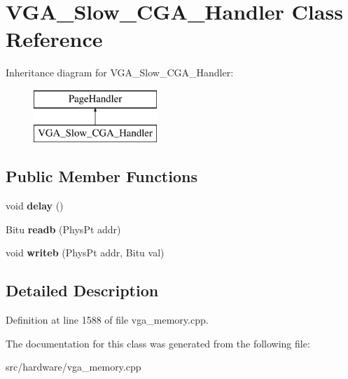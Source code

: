 \hypertarget{classVGA__Slow__CGA__Handler}{\section{V\-G\-A\-\_\-\-Slow\-\_\-\-C\-G\-A\-\_\-\-Handler Class Reference}
\label{classVGA__Slow__CGA__Handler}
}
Inheritance diagram for V\-G\-A\-\_\-\-Slow\-\_\-\-C\-G\-A\-\_\-\-Handler\-:\begin{figure}[H]
\begin{center}
\leavevmode
\includegraphics[height=2.000000cm]{classVGA__Slow__CGA__Handler}
\end{center}
\end{figure}
\subsection*{Public Member Functions}
\begin{DoxyCompactItemize}
\item 
\hypertarget{classVGA__Slow__CGA__Handler_af8dd584b1fbb765acffe039b47f21181}{void {\bfseries delay} ()}\label{classVGA__Slow__CGA__Handler_af8dd584b1fbb765acffe039b47f21181}

\item 
\hypertarget{classVGA__Slow__CGA__Handler_a0724a16ab5641b5436d5505a81438d47}{Bitu {\bfseries readb} (Phys\-Pt addr)}\label{classVGA__Slow__CGA__Handler_a0724a16ab5641b5436d5505a81438d47}

\item 
\hypertarget{classVGA__Slow__CGA__Handler_a26591aafbb6125366d6e5607ae330077}{void {\bfseries writeb} (Phys\-Pt addr, Bitu val)}\label{classVGA__Slow__CGA__Handler_a26591aafbb6125366d6e5607ae330077}

\end{DoxyCompactItemize}


\subsection{Detailed Description}


Definition at line 1588 of file vga\-\_\-memory.\-cpp.



The documentation for this class was generated from the following file\-:\begin{DoxyCompactItemize}
\item 
src/hardware/vga\-\_\-memory.\-cpp\end{DoxyCompactItemize}
